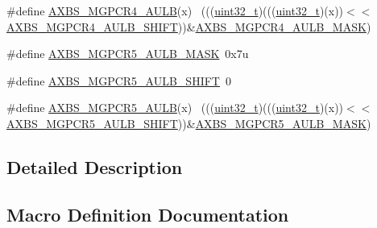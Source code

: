 \begin{DoxyCompactItemize}
\item 
\#define \hyperlink{group___a_x_b_s___register___masks_gae631564e93f8f913be498e840021e642}{A\+X\+B\+S\+\_\+\+M\+G\+P\+C\+R4\+\_\+\+A\+U\+LB}(x)                                        ~(((\hyperlink{_p_e___types_8h_a33594304e786b158f3fb30289278f5af}{uint32\+\_\+t})(((\hyperlink{_p_e___types_8h_a33594304e786b158f3fb30289278f5af}{uint32\+\_\+t})(x))$<$$<$\hyperlink{group___a_x_b_s___register___masks_gaf8f91ac5ba555a8dc2a1733463145139}{A\+X\+B\+S\+\_\+\+M\+G\+P\+C\+R4\+\_\+\+A\+U\+L\+B\+\_\+\+S\+H\+I\+FT}))\&\hyperlink{group___a_x_b_s___register___masks_ga0e8cb920fbcfaaefe210dedc102129d1}{A\+X\+B\+S\+\_\+\+M\+G\+P\+C\+R4\+\_\+\+A\+U\+L\+B\+\_\+\+M\+A\+SK})
\item 
\#define \hyperlink{group___a_x_b_s___register___masks_gaea6c5a570e0ec08d6419d8da4e6d82fd}{A\+X\+B\+S\+\_\+\+M\+G\+P\+C\+R5\+\_\+\+A\+U\+L\+B\+\_\+\+M\+A\+SK}~0x7u
\item 
\#define \hyperlink{group___a_x_b_s___register___masks_gab23b7b12e97e5a14e012697fc5b4ee49}{A\+X\+B\+S\+\_\+\+M\+G\+P\+C\+R5\+\_\+\+A\+U\+L\+B\+\_\+\+S\+H\+I\+FT}~0
\item 
\#define \hyperlink{group___a_x_b_s___register___masks_gab7a9cbbe6c77b5c5253038b39e592f40}{A\+X\+B\+S\+\_\+\+M\+G\+P\+C\+R5\+\_\+\+A\+U\+LB}(x)                                        ~(((\hyperlink{_p_e___types_8h_a33594304e786b158f3fb30289278f5af}{uint32\+\_\+t})(((\hyperlink{_p_e___types_8h_a33594304e786b158f3fb30289278f5af}{uint32\+\_\+t})(x))$<$$<$\hyperlink{group___a_x_b_s___register___masks_gab23b7b12e97e5a14e012697fc5b4ee49}{A\+X\+B\+S\+\_\+\+M\+G\+P\+C\+R5\+\_\+\+A\+U\+L\+B\+\_\+\+S\+H\+I\+FT}))\&\hyperlink{group___a_x_b_s___register___masks_gaea6c5a570e0ec08d6419d8da4e6d82fd}{A\+X\+B\+S\+\_\+\+M\+G\+P\+C\+R5\+\_\+\+A\+U\+L\+B\+\_\+\+M\+A\+SK})
\end{DoxyCompactItemize}


\subsection{Detailed Description}


\subsection{Macro Definition Documentation}
